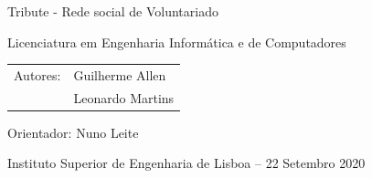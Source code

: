 \begin{frame}[t,plain]

\vspace{0.5em}


\centering
{\LARGE Tribute - Rede social de Voluntariado}

\vspace{0.5em}

Licenciatura em Engenharia Informática e de Computadores

\vspace{0.5em}	

\begin{tabular}{rl}
	Autores: & Guilherme Allen \\
	             & Leonardo Martins
\end{tabular}

\vspace{0.5em}

Orientador:  Nuno Leite 

\vspace{0.5em}

Instituto Superior de Engenharia de Lisboa -- 22 Setembro 2020

\end{frame}